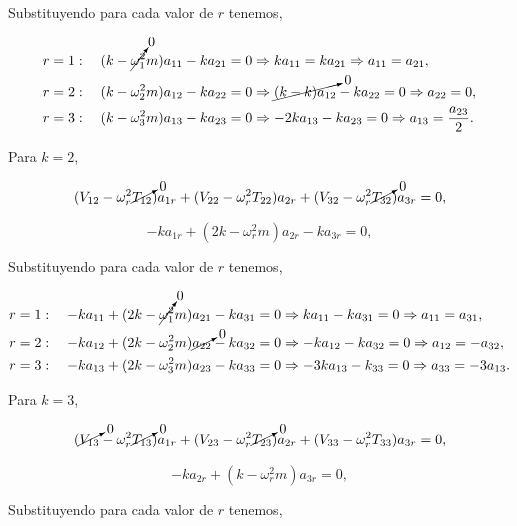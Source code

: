 \documentclass[a4paper,10pt]{article}
\numberwithin{equation}{section}
\begin{document}
Substituyendo para cada valor de $r$ tenemos,

\begin{align}
 r &= 1: \quad (k - \cancelto{0}{\omega_1^2}m)a_{11} - k a_{21} = 0 \Rightarrow 
 ka_{11} = ka_{21} \Rightarrow a_{11} = a_{21}, \\
 r &= 2: \quad (k - \omega_2^2m)a_{12} - ka_{22} = 0 \Rightarrow 
 \cancelto{0}{(k - k)a_{12}} - k a_{22} = 0 \Rightarrow a_{22} = 0, \\
 r &= 3: \quad (k - \omega_3^2m)a_{13} - ka_{23} = 0 \Rightarrow  
 -2ka_{13} - ka_{23} = 0 \Rightarrow a_{13} = \frac{a_{23}}{2}.
\end{align}

Para $k=2$,

\begin{equation}
 (V_{12} - \omega_r^2 \cancelto{0}{T_{12}})a_{1r} + (V_{22} - \omega_r^2 T_{22})a_{2r} + 
 (V_{32} - \omega_r^2 \cancelto{0}{T_{32}})a_{3r}= 0,
\end{equation}

\begin{equation}
 -ka_{1r} + (2k - \omega_r^2m)a_{2r} - ka_{3r} = 0,
\end{equation}

Substituyendo para cada valor de $r$ tenemos,

\begin{align}
 r &=1: \quad -ka_{11} + (2k - \cancelto{0}{\omega_1^2}m)a_{21} - ka_{31} = 0 \Rightarrow
 ka_{11} - ka_{31} = 0 \Rightarrow a_{11} = a_{31}, \\
 r &=2: \quad -ka_{12} + (2k - \omega_2^2m)\cancelto{0}{a_{22}} - ka_{32} = 0 \Rightarrow
 -ka_{12} - ka_{32} = 0 \Rightarrow a_{12} = -a_{32},\\
 r &=3: \quad -ka_{13} + (2k - \omega_3^2m)a_{23} - ka_{33} = 0 \Rightarrow 
 -3ka_{13} - k_{33} = 0 \Rightarrow a_{33} = -3a_{13}.
\end{align}

Para $k=3$, 

\begin{equation}
 (\cancelto{0}{V_{13}} - \omega_r^2\cancelto{0}{T_{13}})a_{1r} +  (V_{23} - \omega_r^2\cancelto{0}{T_{23}})a_{2r} 
 +  (V_{33} - \omega_r^2T_{33})a_{3r} = 0,
\end{equation}

\begin{equation}
 -ka_{2r} + (k - \omega_r^2m)a_{3r} = 0,
\end{equation}

Substituyendo para cada valor de $r$ tenemos,
\end{document}
